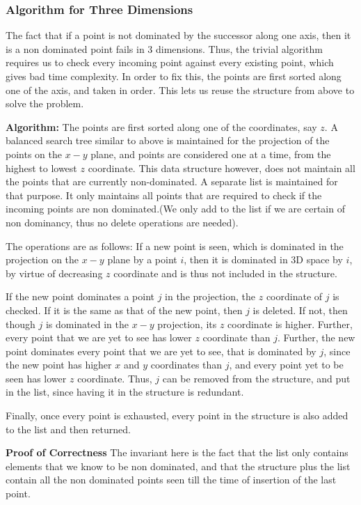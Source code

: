 \documentclass{article}
\begin{document}
\subsubsection{Algorithm for Three Dimensions}
The fact that if a point is not dominated by the successor along one axis, then it is a non dominated point fails in $3$ dimensions.
Thus, the trivial algorithm requires us to check every incoming point against every existing point, which gives bad time complexity.
In order to fix this, the points are first sorted along one of the axis, and taken in order.
This lets us reuse the structure from above to solve the problem.
\par
\textbf{Algorithm:} The points are first sorted along one of the coordinates, say $z$.
A balanced search tree similar to above is maintained for the projection of the points on the $x-y$ plane, and points are considered one at a time, from the highest to lowest $z$ coordinate.
This data structure however, does not maintain all the points that are currently non-dominated. A separate list is maintained for that purpose.
It only maintains all points that are required to check if the incoming points are non dominated.(We only add to the list if we are certain of non dominancy, thus no delete operations are needed).
\par
The operations are as follows:
If a new point is seen, which is dominated in the projection on the $x-y$ plane by a point $i$, then it is dominated in 3D space by $i$, by virtue of decreasing $z$ coordinate and is thus not included in the structure.
\par
If the new point dominates a point $j$ in the projection, the $z$ coordinate of $j$ is checked.
If it is the same as that of the new point, then $j$ is deleted.
If not, then though $j$ is dominated in the $x-y$ projection, its $z$ coordinate is higher.
Further, every point that we are yet to see has lower $z$ coordinate than $j$.
Further, the new point dominates every point that we are yet to see, that is dominated by $j$, since the new point has higher $x$ and $y$ coordinates than $j$, and every point yet to be seen has lower $z$ coordinate.
Thus, $j$ can be removed from the structure, and put in the list, since having it in the structure is redundant.
\par
Finally, once every point is exhausted, every point in the structure is also added to the list and then returned.
\par
\textbf{Proof of Correctness}
The invariant here is the fact that the list only contains elements that we know to be non dominated, and that the structure plus the list contain all the non dominated points seen till the time of insertion of the last point.
\end{document}
